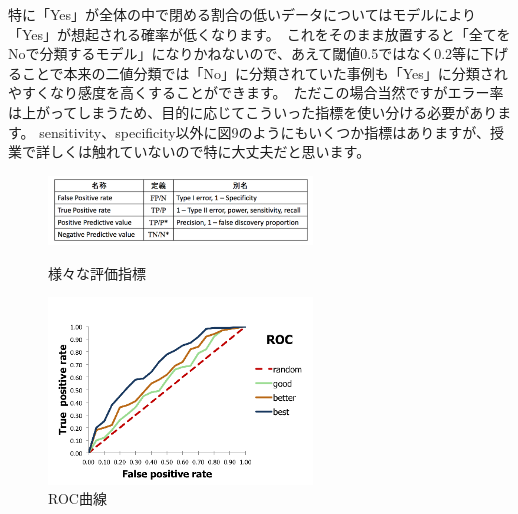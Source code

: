 \documentclass[uplatex]{jsarticle}
\begin{document}
特に「Yes」が全体の中で閉める割合の低いデータについてはモデルにより「Yes」が想起される確率が低くなります。\
これをそのまま放置すると「全てをNoで分類するモデル」になりかねないので、あえて閾値0.5ではなく0.2等に下げることで本来の二値分類では「No」に分類されていた事例も「Yes」に分類されやすくなり感度を高くすることができます。\
ただこの場合当然ですがエラー率は上がってしまうため、目的に応じてこういった指標を使い分ける必要があります。
sensitivity、specificity以外に図9のようにもいくつか指標はありますが、授業で詳しくは触れていないので特に大丈夫だと思います。
\begin{figure}[htbp]
\begin{minipage}{0.5\hsize}
 \begin{center}
  \includegraphics[width=70mm]{img/sihyo.png}
 \end{center}
 \caption{様々な評価指標}
 \label{fig:one}
\end{minipage}
\begin{minipage}{0.5\hsize}
 \begin{center}
  \includegraphics[width=70mm]{img/ROC.png}
 \end{center}
 \caption{ROC曲線}
 \label{fig:two}
\end{minipage}
\end{figure}
\end{document}
